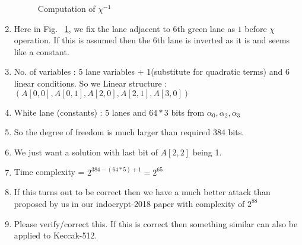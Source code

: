 \documentclass{article}
\begin{document}
\begin{enumerate}
\begin{figure}[ht]
\begin{center}
\end{center}
\caption{Computation of $\chi^{-1}$\label{chi_inv2}}
\end{figure}
    \item Here in Fig. ~\ref{chi_inv2}, we fix the lane adjacent to 6th green lane as $1$ before $\chi$ operation. If this is assumed then the 6th lane is inverted as it is and seems like a constant.
    \item No. of variables : 5 lane variables + 1(substitute for quadratic terms) and 6 linear conditions. So we Linear structure : $(A[0,0], A[0,1], A[2, 0], A[2,1], A[3,0])$
    \item White lane (constants) : 5 lanes and $64*3$ bits from $\alpha_0, \alpha_2, \alpha_3$
    \item So the degree of freedom is much larger than required 384 bits.
    \item We just want a solution with last bit of $A[2,2]$ being 1.
    \item Time complexity = $2^{384 - (64*5) + 1} = 2^{65}$
    \item If this turns out to be correct then we have a much better attack than proposed by us in our indocrypt-2018 paper with complexity of $2^{88}$
    \item Please verify/correct this. If this is correct then something similar can also be applied to Keccak-512.
\end{enumerate}
\end{document}
